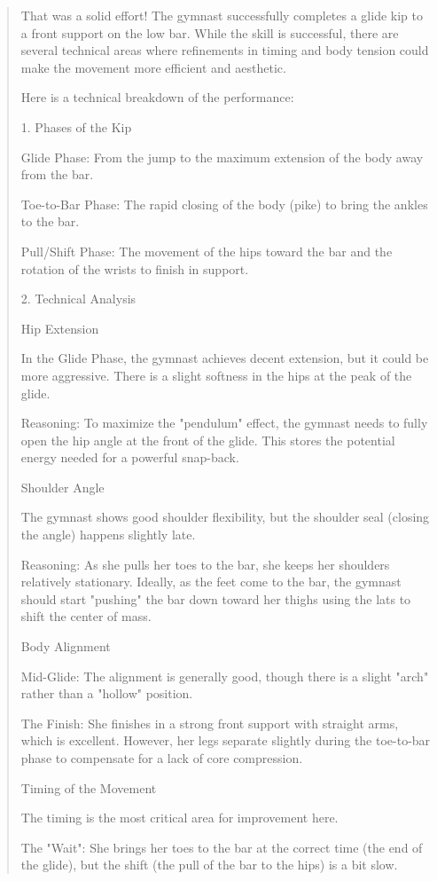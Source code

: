 \begin{quote}
That was a solid effort! The gymnast successfully completes a glide kip to a front support on the low bar. While the skill is successful, there are several technical areas where refinements in timing and body tension could make the movement more efficient and aesthetic.

Here is a technical breakdown of the performance:

1. Phases of the Kip

Glide Phase: From the jump to the maximum extension of the body away from the bar.

Toe-to-Bar Phase: The rapid closing of the body (pike) to bring the ankles to the bar.

Pull/Shift Phase: The movement of the hips toward the bar and the rotation of the wrists to finish in support.

2. Technical Analysis

Hip Extension

In the Glide Phase, the gymnast achieves decent extension, but it could be more aggressive. There is a slight softness in the hips at the peak of the glide.

Reasoning: To maximize the "pendulum" effect, the gymnast needs to fully open the hip angle at the front of the glide. This stores the potential energy needed for a powerful snap-back.

Shoulder Angle

The gymnast shows good shoulder flexibility, but the shoulder seal (closing the angle) happens slightly late.

Reasoning: As she pulls her toes to the bar, she keeps her shoulders relatively stationary. Ideally, as the feet come to the bar, the gymnast should start "pushing" the bar down toward her thighs using the lats to shift the center of mass.

Body Alignment

Mid-Glide: The alignment is generally good, though there is a slight "arch" rather than a "hollow" position.

The Finish: She finishes in a strong front support with straight arms, which is excellent. However, her legs separate slightly during the toe-to-bar phase to compensate for a lack of core compression.

Timing of the Movement

The timing is the most critical area for improvement here.

The "Wait": She brings her toes to the bar at the correct time (the end of the glide), but the shift (the pull of the bar to the hips) is a bit slow.


\end{quote}
